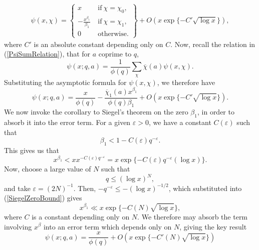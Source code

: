\begin{align}
    \psi(x, \chi) = \left\{\begin{array}{cc} 
        x & \ \textrm{if} \ \chi = \chi_0, \\
        -\frac{x^{\beta_1}}{\beta_1} & \ \textrm{if} \ \chi = \chi_1, \\
        0 & \ \textrm{otherwise.}
    \end{array}\right\} + O(x \exp \{-C' \sqrt{\log x}\} ), \nonumber
\end{align}
where $C'$ is an absolute constant depending only on $C$. Now, recall the relation in (\ref{PsiSumRelation}), that for $a$ coprime to $q$,
\begin{equation}
    \psi(x; q, a) = \frac{1}{\phi(q)} \sum_{\chi} \overline{\chi}(a) \psi(x, \chi). \nonumber
\end{equation}
Substituting the asymptotic formula for $\psi(x, \chi)$, we therefore have
\begin{equation}
    \psi(x; q, a) = \frac{x}{\phi(q)} - \frac{\overline{\chi}_1(a) x^{\beta_1}}{\phi(q) \beta_1} + O(x \exp \{-C' \sqrt{\log x}\} ). \nonumber
\end{equation}
We now invoke the corollary to Siegel's theorem on the zero $\beta_1$, in order to absorb it into the error term. For a given $\varepsilon > 0$, we have a constant $C(\varepsilon)$ such that
\begin{equation}
    \beta_1 < 1 - C(\varepsilon) q^{-\varepsilon}. \nonumber
\end{equation}
This gives us that
\begin{equation}
\label{SiegelZeroBound}
    x^{\beta_1} < x x^{-C(\varepsilon) q^{-\varepsilon}} = x \exp \{ -C(\varepsilon) q^{-\varepsilon} (\log x) \}. 
\end{equation}
Now, choose a large value of $N$ such that 
\begin{equation}
    \label{qCondition}
    q \leq (\log x)^{N}, 
\end{equation}
and take $\varepsilon = (2N)^{-1}$. Then, $-q^{-\varepsilon} \leq -(\log x)^{-1/2}$, which substituted into (\ref{SiegelZeroBound}) gives
\begin{equation}
    x^{\beta_1} \ll x \exp \{ -C(N) \sqrt{\log x} \}, \nonumber
\end{equation}
where $C$ is a constant depending only on $N$. We therefore may absorb the term involving $x^{\beta}$ into an error term which depends only on $N$, giving the key result
\begin{equation}
\label{PsiChiAsymptotic}
    \psi(x; q, a) = \frac{x}{\phi(q)} + O(x \exp \{-C'(N) \sqrt{\log x} \})
\end{equation}
